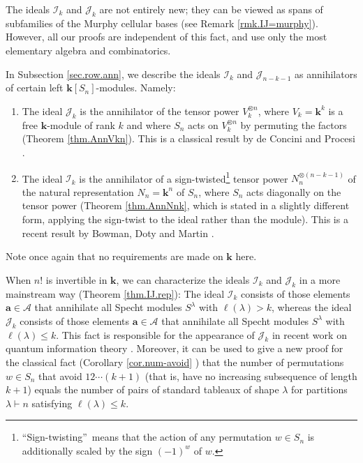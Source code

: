\documentclass[numbers=enddot,12pt,final,onecolumn,notitlepage]{scrartcl}%
\numberwithin{exer}{subsection}
\theoremstyle{definition}
\begin{document}
The ideals $\mathcal{I}_{k}$ and $\mathcal{J}_{k}$ are not entirely new; they
can be viewed as spans of subfamilies of the Murphy cellular bases (see Remark
\ref{rmk.IJ=murphy}). However, all our proofs are independent of this fact,
and use only the most elementary algebra and combinatorics.

In Subsection \ref{sec.row.ann}, we describe the ideals $\mathcal{I}_{k}$ and
$\mathcal{J}_{n-k-1}$ as annihilators of certain left $\mathbf{k}\left[
S_{n}\right]  $-modules. Namely:

\begin{enumerate}
\item The ideal $\mathcal{J}_{k}$ is the annihilator of the tensor power
$V_{k}^{\otimes n}$, where $V_{k}=\mathbf{k}^{k}$ is a free $\mathbf{k}%
$-module of rank $k$ and where $S_{n}$ acts on $V_{k}^{\otimes n}$ by
permuting the factors (Theorem \ref{thm.AnnVkn}). This is a classical result
by de Concini and Procesi \cite[Theorem 4.2]{deCPro76}.

\item The ideal $\mathcal{I}_{k}$ is the annihilator of a
sign-twisted\footnote{\textquotedblleft Sign-twisting\textquotedblright\ means
that the action of any permutation $w\in S_{n}$ is additionally scaled by the
sign $\left(  -1\right)  ^{w}$ of $w$.} tensor power $N_{n}^{\otimes\left(
n-k-1\right)  }$ of the natural representation $N_{n}=\mathbf{k}^{n}$ of
$S_{n}$, where $S_{n}$ acts diagonally on the tensor power (Theorem
\ref{thm.AnnNnk}, which is stated in a slightly different form, applying the
sign-twist to the ideal rather than the module). This is a recent result by
Bowman, Doty and Martin \cite[Theorem 7.4 (a)]{BoDoMa18}.
\end{enumerate}

Note once again that no requirements are made on $\mathbf{k}$ here.

When $n!$ is invertible in $\mathbf{k}$, we can characterize the ideals
$\mathcal{I}_{k}$ and $\mathcal{J}_{k}$ in a more mainstream way (Theorem
\ref{thm.IJ.rep}): The ideal $\mathcal{I}_{k}$ consists of those elements
$\mathbf{a}\in\mathcal{A}$ that annihilate all Specht modules $S^{\lambda}$
with $\ell\left(  \lambda\right)  >k$, whereas the ideal $\mathcal{J}_{k}$
consists of those elements $\mathbf{a}\in\mathcal{A}$ that annihilate all
Specht modules $S^{\lambda}$ with $\ell\left(  \lambda\right)  \leq k$. This
fact is responsible for the appearance of $\mathcal{J}_{k}$ in recent work on
quantum information theory \cite[Theorem 2.2]{KlStVo25}. Moreover, it can be
used to give a new proof for the classical fact (Corollary \ref{cor.num-avoid}%
) that the number of permutations $w\in S_{n}$ that avoid $12\cdots\left(
k+1\right)  $ (that is, have no increasing subsequence of length $k+1$) equals
the number of pairs of standard tableaux of shape $\lambda$ for partitions
$\lambda\vdash n$ satisfying $\ell\left(  \lambda\right)  \leq k$.
\end{document}
